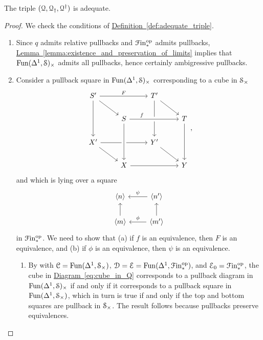 \documentclass[main.tex]{subfiles}
\begin{document}
\begin{lemma}
  The triple $\triple{Q}$ is adequate.
\end{lemma}
\begin{proof}
  We check the conditions of \hyperref[def:adequate_triple]{Definition~\ref*{def:adequate_triple}}.
  \begin{enumerate}
    \item Since $q$ admits relative pullbacks and $\Finp\op$ admits pullbacks, \hyperref[lemma:existence_and_preservation_of_limits]{Lemma~\ref*{lemma:existence_and_preservation_of_limits}} implies that $\Fun(\Delta^{1}, \S)_{\times}$ admits all pullbacks, hence certainly ambigressive pullbacks.

    \item Consider a pullback square in $\Fun(\Delta^{1}, \S)_{\times}$ corresponding to a cube in $\S_{\times}$
      \begin{equation}
        \label{eq:cube_in_Q}
        \begin{tikzcd}
          S'
          \arrow[rr, "F"]
          \arrow[dd]
          \arrow[dr]
          && T'
          \arrow[dd]
          \arrow[dr]
          \\
          & S
          \arrow[rr, crossing over, near start, "f"]
          && T
          \arrow[dd]
          \\
          X'
          \arrow[dr]
          \arrow[rr]
          && Y'
          \arrow[dr]
          \\
          & X
          \arrow[from=uu, crossing over]
          \arrow[rr]
          && Y
        \end{tikzcd},
      \end{equation}
      and which is lying over a square
      \begin{equation}
        \label{eq:square_in_finp_under_Q}
        \begin{tikzcd}
          \langle n \rangle
          & \langle n' \rangle
          \arrow[l, swap, "\psi"]
          \\
          \langle m \rangle
          \arrow[u]
          & \langle m' \rangle
          \arrow[l, swap, "\phi"]
          \arrow[u]
        \end{tikzcd}
      \end{equation}
      in $\Finp\op$. We need to show that (a) if $f$ is an equivalence, then $F$ is an equivalence, and (b) if $\phi$ is an equivalence, then $\psi$ is an equivalence.
      \begin{enumerate}
        \item By \cite[Cor.\ 4.3.1.15]{highertopostheory} with $\category{C} = \Fun(\Delta^{1}, \S_{\times})$, $\category{D} = \category{E} = \Fun(\Delta^{1}, \Finp\op)$, and $\category{E}_{0} = \Finp\op$, the cube in \hyperref[eq:cube_in_Q]{Diagram~\ref*{eq:cube_in_Q}} corresponds to a pullback diagram in $\Fun(\Delta^{1}, \S)_{\times}$ if and only if it corresponds to a pullback square in $\Fun(\Delta^{1}, \S_{\times})$, which in turn is true if and only if the top and bottom squares are pullback in $\S_{\times}$. The result follows because pullbacks preserve equivalences.


\end{enumerate}
\end{enumerate}
\end{proof}
\end{document}
